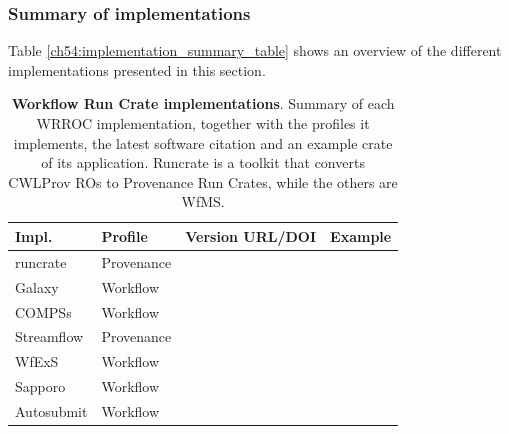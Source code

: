 \subsubsection{Summary of implementations}

Table \vref{ch54:implementation_summary_table} shows an overview of the different implementations presented in this section.


\begin{table}[htp]
  \begin{tabular}{l|l|l|l}
  \hline
  {\bf Impl.} & {\bf Profile} & {\bf Version URL/DOI} &
  {\bf Example}\\
  \hline
  runcrate & Provenance & \footnotesize \cite{Leo 2023a}  & \footnotesize \cite{Leo 2023} \\
  Galaxy & Workflow & \footnotesize \cite{Afgan 2023} & \footnotesize \cite{De Geest 2023b} \\
  COMPSs & Workflow & \footnotesize \cite{Ejarque 2023} & \footnotesize \cite{Poiata 2023} \\
  Streamflow & Provenance & \footnotesize \cite{Colonnelli 2023b} & \footnotesize \cite{Colonnelli 2023a} \\
  WfExS & Workflow & \footnotesize \cite{Fernández 2023a} & \footnotesize \cite{Fernández 2023b} \\
  Sapporo & Workflow & \footnotesize \cite{Suetake 2023b} & \footnotesize \cite{Ohta 2023} \\
  Autosubmit & Workflow & \footnotesize \cite{Beltrán 2023} & \footnotesize \cite{Kinoshita 2023} \\
  \end{tabular}
    
\caption[Workflow Run Crate implementations]{{\bf Workflow Run Crate implementations}. Summary of each \acrshort{WRROC} implementation, together with the profiles it implements, the latest software citation and an example crate of its application. Runcrate is a toolkit that converts CWLProv ROs to Provenance Run Crates, while the others are WfMS.}
  \label{ch54:implementation_summary_table}
\end{table}
  


